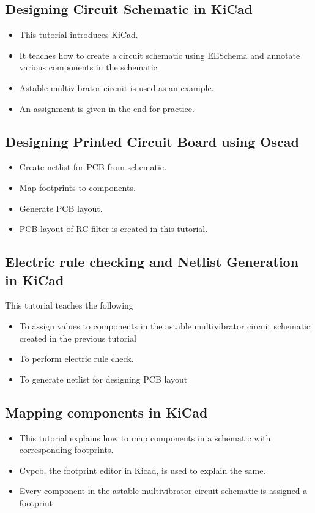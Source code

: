 \subsection {Designing Circuit Schematic in KiCad}

\begin{itemize}
\item This tutorial introduces KiCad.
\item It teaches how to create a circuit schematic using EESchema and annotate various components in the schematic.
\item Astable multivibrator circuit is used as an example.
\item An assignment is given in the end for practice.
\end{itemize}

\subsection{Designing Printed Circuit Board using Oscad}

\begin{itemize}
\item Create netlist for PCB from schematic.
\item Map footprints to components.
\item Generate PCB layout.
\item PCB layout of RC filter is created in this tutorial.
\end{itemize}

\subsection{Electric rule checking and Netlist Generation in KiCad}
This tutorial teaches the following
\begin{itemize}
\item To assign values to components in the astable multivibrator circuit schematic
created in the previous tutorial
\item To perform electric rule check.
\item To generate netlist for designing PCB layout

\end{itemize}

\subsection{Mapping components in KiCad}
\begin{itemize}
\item This tutorial explains how to  map components in a schematic with corresponding
footprints.
\item Cvpcb, the footprint editor in Kicad, is used to explain the same.
\item Every component in the astable multivibrator circuit schematic is assigned a footprint 
\end{itemize}

